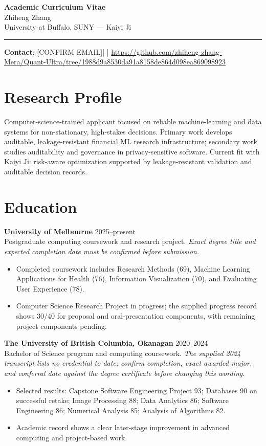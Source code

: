 \documentclass[11pt]{article}
\newcommand{\ApplicantName}{Zhiheng Zhang}
\newcommand{\ApplicantEmail}{[CONFIRM EMAIL]}
\newcommand{\ApplicantPhone}{[CONFIRM PHONE]}
\newcommand{\ApplicantGitHub}{\url{https://github.com/zhiheng-zhang-Mera/Quant-Ultra/tree/1988d9a8530da91a8158de864d098ea869098923}}
\begin{document}
\begin{center}
{\LARGE\bfseries Academic Curriculum Vitae}\\[0.25em]
{\large \ApplicantName}\\
University at Buffalo, SUNY --- Kaiyi Ji
\end{center}
\vspace{0.35em}\hrule\vspace{0.65em}

\textbf{Contact}: \ApplicantEmail\quad | \quad \ApplicantPhone\quad | \quad \ApplicantGitHub

\section*{Research Profile}
Computer-science-trained applicant focused on reliable machine-learning and data systems for non-stationary, high-stakes decisions. Primary work develops auditable, leakage-resistant financial ML research infrastructure; secondary work studies auditability and governance in privacy-sensitive software. Current fit with Kaiyi Ji: risk-aware optimization supported by leakage-resistant validation and auditable decision records.

\section*{Education}
\textbf{University of Melbourne} \hfill 2025--present\\
Postgraduate computing coursework and research project. \textit{Exact degree title and expected completion date must be confirmed before submission.}
\begin{itemize}
\item Completed coursework includes Research Methods (69), Machine Learning Applications for Health (76), Information Visualization (70), and Evaluating User Experience (78).
\item Computer Science Research Project in progress; the supplied progress record shows 30/40 for proposal and oral-presentation components, with remaining project components pending.
\end{itemize}

\textbf{The University of British Columbia, Okanagan} \hfill 2020--2024\\
Bachelor of Science program and computing coursework. \textit{The supplied 2024 transcript lists no credential to date; confirm completion, exact awarded major, and conferral date against the degree certificate before changing this wording.}
\begin{itemize}
\item Selected results: Capstone Software Engineering Project 93; Databases 90 on successful retake; Image Processing 88; Data Analytics 86; Software Engineering 86; Numerical Analysis 85; Analysis of Algorithms 82.
\item Academic record shows a clear later-stage improvement in advanced computing and project-based work.
\end{itemize}
\end{document}
